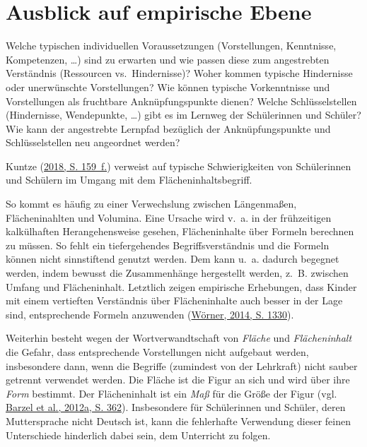 \documentclass[
]{scrbook}
\renewenvironment{quote}{
  \list{}{
	\leftmargin0.2cm   %
    \rightmargin\leftmargin
      	\def\FrameCommand
    {%
        {\color{quoteColor}\vrule width 2pt}%
        \hspace{0pt}%
    }%
    \MakeFramed{\advance \hsize -\width \FrameRestore}    \color{quoteColor}
    }
  \item\relax
}
{\endlist\color{black}\endMakeFramed}
\theoremstyle{definition}
\theoremstyle{definition}
\theoremstyle{definition}
\theoremstyle{definition}
\theoremstyle{remark}
\begin{document}
\hypertarget{ausblick-auf-empirische-ebene}{%
\section{Ausblick auf empirische Ebene}\label{ausblick-auf-empirische-ebene}}

\begin{quote}
Welche typischen individuellen Voraussetzungen (Vorstellungen, Kenntnisse, Kompetenzen, \ldots) sind zu erwarten und wie passen diese zum angestrebten Verständnis (Ressourcen vs.~Hindernisse)?
Woher kommen typische Hindernisse oder unerwünschte Vorstellungen?
Wie können typische Vorkenntnisse und Vorstellungen als fruchtbare Anknüpfungspunkte dienen?
Welche Schlüsselstellen (Hindernisse, Wendepunkte, \ldots) gibt es im Lernweg der Schülerinnen und Schüler?
Wie kann der angestrebte Lernpfad bezüglich der Anknüpfungspunkte und Schlüsselstellen neu angeordnet werden?
\end{quote}

Kuntze (\protect\hyperlink{ref-Kuntze2018}{2018, S. 159~f.}) verweist auf typische Schwierigkeiten von Schülerinnen und Schülern im Umgang mit dem Flächeninhaltsbegriff.

So kommt es häufig zu einer Verwechslung zwischen Längenmaßen, Flächeninahlten und Volumina. Eine Ursache wird v.~a. in der frühzeitigen kalkülhaften Herangehensweise gesehen, Flächeninhalte über Formeln berechnen zu müssen. So fehlt ein tiefergehendes Begriffsverständnis und die Formeln können nicht sinnstiftend genutzt werden. Dem kann u.~a. dadurch begegnet werden, indem bewusst die Zusammenhänge hergestellt werden, z.~B. zwischen Umfang und Flächeninhalt.
Letztlich zeigen empirische Erhebungen, dass Kinder mit einem vertieften Verständnis über Flächeninhalte auch besser in der Lage sind, entsprechende Formeln anzuwenden (\protect\hyperlink{ref-Worner2014}{Wörner, 2014, S. 1330}).

Weiterhin besteht wegen der Wortverwandtschaft von \emph{Fläche} und \emph{Flächeninhalt} die Gefahr, dass entsprechende Vorstellungen nicht aufgebaut werden, insbesondere dann, wenn die Begriffe (zumindest von der Lehrkraft) nicht sauber getrennt verwendet werden. Die Fläche ist die Figur an sich und wird über ihre \emph{Form} bestimmt. Der Flächeninhalt ist ein \emph{Maß} für die Größe der Figur (vgl. \protect\hyperlink{ref-Barzel2012a}{Barzel et al., 2012a, S. 362}). Insbesondere für Schülerinnen und Schüler, deren Muttersprache nicht Deutsch ist, kann die fehlerhafte Verwendung dieser feinen Unterschiede hinderlich dabei sein, dem Unterricht zu folgen.
\end{document}
